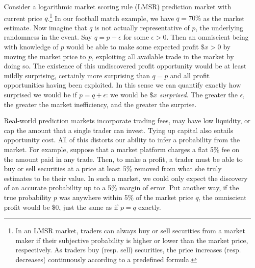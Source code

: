 \documentclass[sigconf,anonymous]{aamas}   %
\newcommand{\dpenn} [1]{\ifnum\Chatty=1 \textcolor{blue}  {dpenn:  [#1]} \fi}
\begin{document}
Consider a logarithmic market scoring rule (LMSR) prediction market with current price $q$.\footnote{In an LMSR market, traders can always buy or sell securities from a market maker if their subjective probability is higher or lower than the market price, respectively. As traders buy (resp. sell) securities, the price increases (resp. decreases) continuously according to a predefined formula.} 
In our football match example, we have $q=70\%$ as the market estimate. 
Now imagine that $q$ is not actually representative of $p$, the underlying randomness in the event. 
Say $q = p+\epsilon$ for some $\epsilon >0$. 
Then an omniscient being with knowledge of $p$ would be able to make some expected profit $\$x>0$ by moving the market price to $p$, exploiting all available trade in the market by doing so. 
The existence of this undiscovered profit opportunity would be at least mildly surprising, certainly more surprising than $q=p$ and all profit opportunities having been exploited.
In this sense we can quantify exactly how surprised we would be if $p=q+\epsilon$: we would be \emph{$\$x$ surprised}. 
The greater the $\epsilon$, the greater the market inefficiency, and the greater the surprise.

Real-world prediction markets incorporate trading fees, may have low liquidity, or cap the amount that a single trader can invest. Tying up capital also entails opportunity cost. All of this distorts our ability to infer a probability from the market. For example, suppose that a market platform charges a flat 5\% fee on the amount paid in any trade.
Then, to make a profit, a trader must be able to buy or sell securities at a price at least 5\% removed from what she truly estimates to be their value. In such a market, we could only expect the discovery of an accurate probability up to a 5\% margin of error. Put another way, if the true probability $p$ was anywhere within 5\% of the market price $q$, the omniscient profit would be $\$0$, just the same as if $p=q$ exactly.
\end{document}
